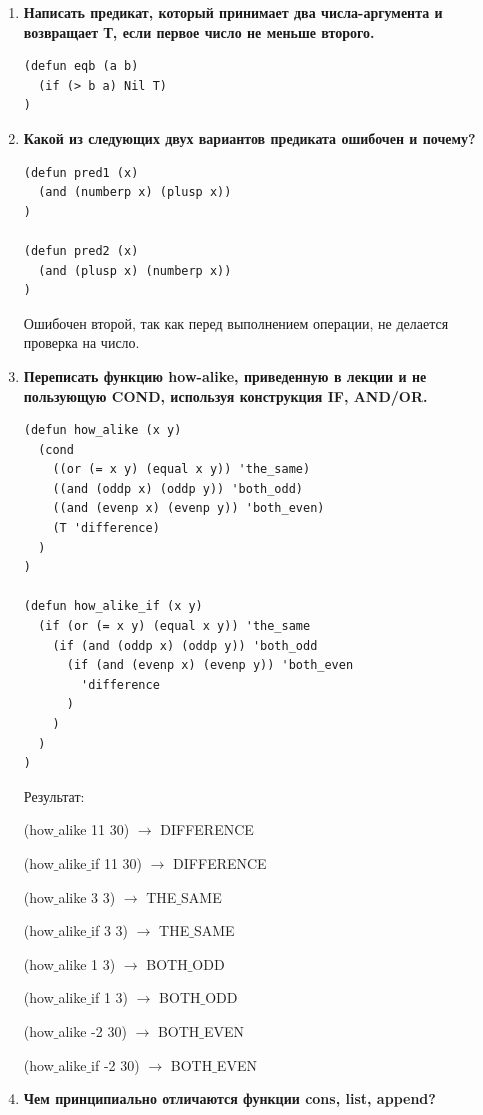 \documentclass[a4paper,14pt]{extreport} %
\begin{document}
\begin{enumerate}
\item \textbf{Написать предикат, который принимает два числа-аргумента и возвращает Т, если первое число не меньше второго.}

\begin{lstlisting}
(defun eqb (a b)
  (if (> b a) Nil T)
)
\end{lstlisting}

\item \textbf{Какой из следующих двух вариантов предиката ошибочен и почему?}

\begin{lstlisting}
(defun pred1 (x)
  (and (numberp x) (plusp x))
)

(defun pred2 (x)
  (and (plusp x) (numberp x))
)
\end{lstlisting}

Ошибочен второй, так как перед выполнением операции, не делается проверка на число. 

\item \textbf{Переписать функцию how-alike, приведенную в лекции и не пользующую COND, используя конструкция IF, AND/OR.}

\begin{lstlisting}
(defun how_alike (x y)
  (cond 
    ((or (= x y) (equal x y)) 'the_same)
    ((and (oddp x) (oddp y)) 'both_odd)
    ((and (evenp x) (evenp y)) 'both_even)
    (T 'difference)
  ) 
)

(defun how_alike_if (x y)
  (if (or (= x y) (equal x y)) 'the_same
    (if (and (oddp x) (oddp y)) 'both_odd
      (if (and (evenp x) (evenp y)) 'both_even 
        'difference
      )
    )
  ) 
)
\end{lstlisting}

Результат:

(how$\_$alike 11 30) $\to$ DIFFERENCE

(how$\_$alike$\_$if 11 30) $\to$ DIFFERENCE

(how$\_$alike 3 3) $\to$ THE$\_$SAME

(how$\_$alike$\_$if 3 3) $\to$ THE$\_$SAME

(how$\_$alike 1 3) $\to$ BOTH$\_$ODD

(how$\_$alike$\_$if 1 3) $\to$ BOTH$\_$ODD

(how$\_$alike -2 30) $\to$ BOTH$\_$EVEN

(how$\_$alike$\_$if -2 30) $\to$ BOTH$\_$EVEN

\item \textbf{Чем принципиально отличаются функции cons, list, append?}


\end{enumerate}
\end{document}
